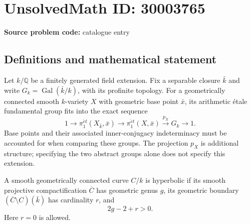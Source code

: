 \documentclass[11pt]{article}
\newcommand{\Q}{\mathbb{Q}}
\begin{document}
\section*{UnsolvedMath ID: 30003765}
\textbf{Source problem code:} catalogue entry
\subsection{Definitions and mathematical statement}
Let \(k/\Q\) be a finitely generated field extension. Fix a separable closure \(\bar k\) and write \(G_k=\operatorname{Gal}(\bar k/k)\), with its profinite topology. For a geometrically connected smooth \(k\)-variety \(X\) with geometric base point \(\bar x\), its arithmetic étale fundamental group fits into the exact sequence
\[
1\longrightarrow \pi_1^{\acute{e}t}(X_{\bar k},\bar x)
\longrightarrow \pi_1^{\acute{e}t}(X,\bar x)
\xrightarrow{p_X}G_k\longrightarrow 1.
\]
Base points and their associated inner-conjugacy indeterminacy must be accounted for when comparing these groups. The projection \(p_X\) is additional structure; specifying the two abstract groups alone does not specify this extension.

A smooth geometrically connected curve \(C/k\) is hyperbolic if its smooth projective compactification \(\overline C\) has geometric genus \(g\), its geometric boundary \((\overline C\setminus C)(\bar k)\) has cardinality \(r\), and
\[
2g-2+r>0.
\]
Here \(r=0\) is allowed.
\end{document}
